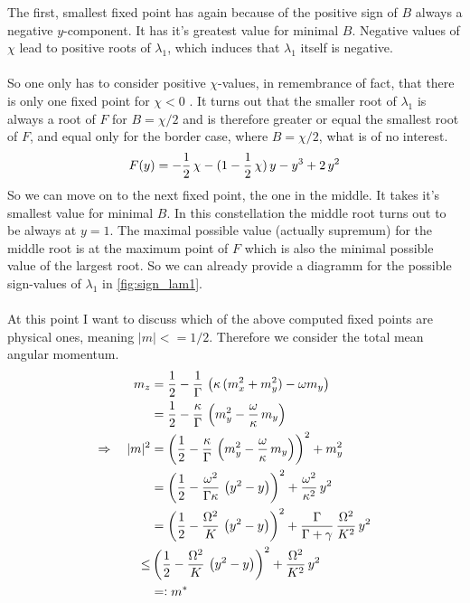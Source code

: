 \documentclass{article}
\begin{document}
The first, smallest fixed point has again because of the positive sign of $B$ always a negative $y$-component. It has it's greatest value for minimal $B$. Negative values of $\chi$ lead to positive roots of $\lambda_1$, which induces that $\lambda_1$ itself is negative. \\\\
So one only has to consider positive $\chi$-values, in remembrance of fact, that there is only one fixed point for $\chi<0$ . It turns out that the smaller root of $\lambda_1$ is always a root of $F$ for $B=\chi/2$ and is therefore greater or equal the smallest root of $F$, and equal only for the border case, where $B=\chi/2$, what is of no interest.
\begin{align*}
    F({y})=-\frac{1}{2}\,\chi-(1-\frac{1}{2}\,\chi)\,{y}    - {y}^3+2\,{y}^2
\end{align*}
So we can move on to the next fixed point, the one in the middle. It takes it's smallest value for minimal $B$. In this constellation the middle root turns out to be always at ${y}=1$. The maximal possible value (actually supremum) for the middle root is at the maximum point of $F$ which is also the minimal possible value of the largest root. So we can already provide a diagramm for the possible sign-values of $\lambda_1$ in \autoref{fig:sign_lam1}.\\\\
At this point I want to discuss which of the above computed fixed points are physical ones, meaning $|m|<=1/2$. Therefore we consider the total mean angular momentum.
\begin{align*}
    m_z&=\frac{1}{2}-\frac{1}{\Gamma}\,\left( \kappa\,(m_x^2+m_y^2)-\omega m_y  \right)\\
    &=\frac{1}{2}-\frac{\kappa}{\Gamma}\,\left( m_y^2-\frac{\omega}{\kappa}\, m_y  \right)\\
    \Rightarrow\quad |m|^2&=\left( \frac{1}{2}-\frac{\kappa}{\Gamma}\,\left( m_y^2-\frac{\omega}{\kappa}\, m_y  \right) \right)^2+m_y^2\\
    &=\left( \frac{1}{2}-\frac{\omega^2}{\Gamma\kappa}\,\left( {y}^2- {y} \right) \right)^2+\frac{\omega^2}{\kappa^2}\,{y}^2\\
    &=\left( \frac{1}{2}-\frac{\Omega^2}{K}\,\left( {y}^2- {y} \right) \right)^2+\frac{\Gamma}{\Gamma+\gamma}\,\frac{\Omega^2}{K^2}\,{y}^2\\
    \leq&\left( \frac{1}{2}-\frac{\Omega^2}{K}\,\left( {y}^2- {y} \right) \right)^2+\frac{\Omega^2}{K^2}\,{y}^2\\
    &=\vcentcolon m^*
\end{align*}
\end{document}
